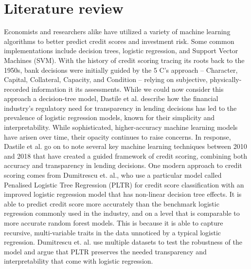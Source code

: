 \documentclass[twocolumn]{article}
\begin{document}
\section*{Literature review}
Economists and researchers alike have utilized a variety of machine learning algorithms to better predict credit scores and investment risk.
Some common implementations include decision trees, logistic regression, and Support Vector Machines (SVM).
\vspace{5mm}\newline
With the history of credit scoring tracing its roots back to the 1950s, bank decisions were initially guided by the
5 C's approach -- Character, Capital, Collateral, Capacity, and Condition -- relying on subjective, physically-recorded information it its
assessments.
While we could now consider this approach a decision-tree model, Dastile et al. describe how the financial industry's regulatory need for
transparency in lending decisions has led to the prevalence of logistic regression models, known for their simplicity and interpretability.
While sophisticated, higher-accuracy machine learning models have arisen over time, their opacity continues to raise concerns.
In response, Dastile et al. go on to note several key machine learning techniques between 2010 and 2018 that have created a guided
framework of credit scoring, combining both accuracy and transparency in lending decisions.
\vspace{5mm}\newline
One modern approach to credit scoring comes from Dumitrescu et. al., who use a particular model called Penalised Logistic Tree Regression
(PLTR) for credit score classification with an improved logistic regression model that has non-linear decision tree effects.
It is able to predict credit score more accurately than the benchmark logistic regression commonly used in the industry, and on a level
that is comparable to more accurate random forest models.
This is because it is able to capture recursive, multi-variable traits in the data unnoticed by a typical logistic regression.
Dumitrescu et. al. use multiple datasets to test the robustness of the model and argue that PLTR preserves the needed transparency and
interpretability that come with logistic regression.
\end{document}
